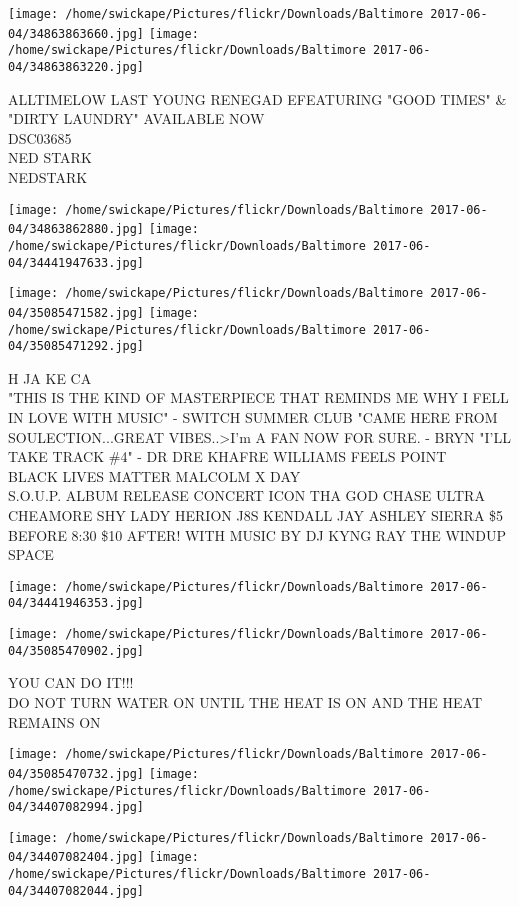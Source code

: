 \documentclass[10pt,letterpaper]{article}
\begin{document}
\texttt{[image: /home/swickape/Pictures/flickr/Downloads/Baltimore 2017-06-04/34863863660.jpg]}
\texttt{[image: /home/swickape/Pictures/flickr/Downloads/Baltimore 2017-06-04/34863863220.jpg]}

ALLTIMELOW LAST YOUNG RENEGAD EFEATURING "GOOD TIMES" \& "DIRTY LAUNDRY" AVAILABLE NOW\\
DSC03685\\
NED STARK\\
NEDSTARK
\pagebreak

\texttt{[image: /home/swickape/Pictures/flickr/Downloads/Baltimore 2017-06-04/34863862880.jpg]}
\texttt{[image: /home/swickape/Pictures/flickr/Downloads/Baltimore 2017-06-04/34441947633.jpg]}

\texttt{[image: /home/swickape/Pictures/flickr/Downloads/Baltimore 2017-06-04/35085471582.jpg]}
\texttt{[image: /home/swickape/Pictures/flickr/Downloads/Baltimore 2017-06-04/35085471292.jpg]}

H JA KE CA\\
"THIS IS THE KIND OF MASTERPIECE THAT REMINDS ME WHY I FELL IN LOVE WITH MUSIC" {-} SWITCH SUMMER CLUB "CAME HERE FROM SOULECTION...GREAT VIBES..>I'm A FAN NOW FOR SURE.  {-} BRYN "I'LL TAKE TRACK \#4" {-} DR DRE KHAFRE WILLIAMS FEELS POINT\\
BLACK LIVES MATTER MALCOLM X DAY\\
S.O.U.P. ALBUM RELEASE CONCERT ICON THA GOD CHASE ULTRA CHEAMORE SHY LADY HERION J8S KENDALL JAY ASHLEY SIERRA \$5 BEFORE 8:30 \$10 AFTER!  WITH MUSIC BY DJ KYNG RAY THE WINDUP SPACE
\pagebreak

\texttt{[image: /home/swickape/Pictures/flickr/Downloads/Baltimore 2017-06-04/34441946353.jpg]}

\vspace{0.25in}
\texttt{[image: /home/swickape/Pictures/flickr/Downloads/Baltimore 2017-06-04/35085470902.jpg]}

YOU CAN DO IT!!!\\
DO NOT TURN WATER ON UNTIL THE HEAT IS ON AND THE HEAT REMAINS ON
\pagebreak

\texttt{[image: /home/swickape/Pictures/flickr/Downloads/Baltimore 2017-06-04/35085470732.jpg]}
\texttt{[image: /home/swickape/Pictures/flickr/Downloads/Baltimore 2017-06-04/34407082994.jpg]}

\texttt{[image: /home/swickape/Pictures/flickr/Downloads/Baltimore 2017-06-04/34407082404.jpg]}
\texttt{[image: /home/swickape/Pictures/flickr/Downloads/Baltimore 2017-06-04/34407082044.jpg]}
\end{document}
